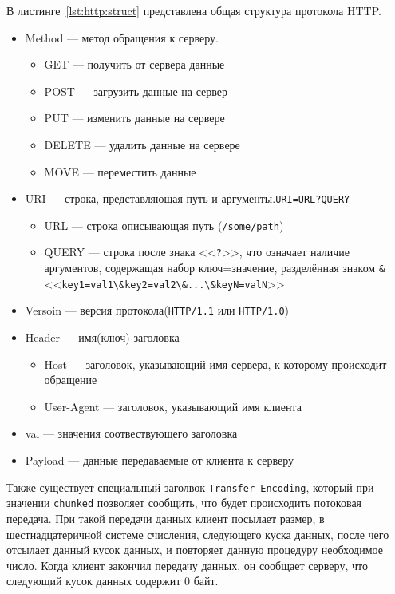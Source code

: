 В листинге~\ref{lst:http:struct} представлена общая структура протокола HTTP.
\begin{itemize}
    \item Method --- метод обращения к серверу.
    \begin{itemize}
        \item GET --- получить от сервера данные
        \item POST --- загрузить данные на сервер
        \item PUT --- изменить данные на сервере
        \item DELETE --- удалить данные на сервере
        \item MOVE --- переместить данные
    \end{itemize}
    \item URI --- строка, представляющая путь и аргументы.{\tt URI=URL?QUERY}
    \begin{itemize}
        \item URL --- строка описывающая путь (\texttt{/some/path})
        \item QUERY --- строка после знака <<\verb!?!>>, что означает наличие аргументов,
            содержащая набор ключ=значение, разделённая знаком \texttt{\&} \\
            <<\verb!key1=val1\&key2=val2\&...\&keyN=valN!>>
    \end{itemize}
    \item Versoin --- версия протокола(\texttt{HTTP/1.1} или \texttt{HTTP/1.0})
    \item Header --- имя(ключ) заголовка
    \begin{itemize}
        \item Host --- заголовок, указывающий имя сервера, к которому происходит обращение
        \item User-Agent --- заголовок, указывающий имя клиента
    \end{itemize}
    \item val --- значения соотвествующего заголовка
    \item Payload --- данные передаваемые от клиента к серверу
\end{itemize}

Также существует специальный заголвок \texttt{Transfer-Encoding}, который при
значении \texttt{chunked} позволяет сообщить, что будет происходить потоковая передача.
При такой передачи данных клиент посылает размер, в шестнадцатеричной системе
счисления, следующего куска данных, после чего отсылает данный кусок данных, и
повторяет данную процедуру необходимое число. Когда клиент закончил передачу данных,
он сообщает серверу, что следующий кусок данных содержит 0 байт.

